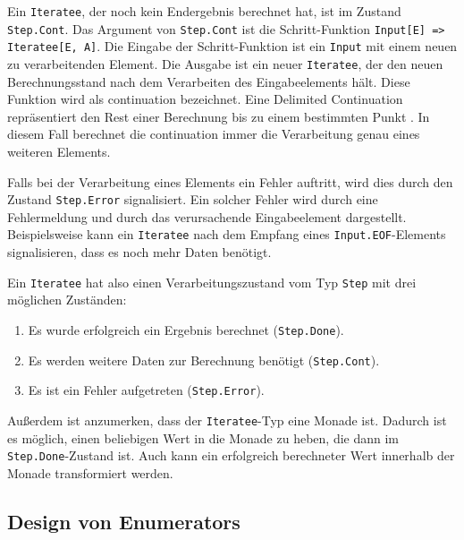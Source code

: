 Ein \lstinline|Iteratee|, der noch kein Endergebnis berechnet hat, ist im Zustand \lstinline|Step.Cont|.
Das Argument von \lstinline|Step.Cont| ist die Schritt-Funktion \lstinline[breaklines=true]|Input[E] => Iteratee[E, A]|.
Die Eingabe der Schritt-Funktion ist ein \lstinline|Input| mit einem neuen zu verarbeitenden Element.
Die Ausgabe ist ein neuer \lstinline|Iteratee|, der den neuen Berechnungsstand nach dem Verarbeiten des Eingabeelements hält.
Diese Funktion wird als \gls{continuation} bezeichnet.
Eine Delimited Continuation repräsentiert den Rest einer Berechnung bis zu einem bestimmten Punkt \cite[vgl.][S.~1]{continuations}.
In diesem Fall berechnet die \gls{continuation} immer die Verarbeitung genau eines weiteren Elements.

Falls bei der Verarbeitung eines Elements ein Fehler auftritt, wird dies durch den Zustand \lstinline|Step.Error| signalisiert.
Ein solcher Fehler wird durch eine Fehlermeldung und durch das verursachende Eingabeelement dargestellt.
Beispielsweise kann ein \lstinline|Iteratee| nach dem Empfang eines \lstinline|Input.EOF|-Elements signalisieren, dass es noch mehr Daten benötigt.

Ein \lstinline|Iteratee| hat also einen Verarbeitungszustand vom Typ \lstinline|Step| mit drei möglichen Zuständen:
\begin{enumerate}
  \item Es wurde erfolgreich ein Ergebnis berechnet (\lstinline|Step.Done|).
  \item Es werden weitere Daten zur Berechnung benötigt (\lstinline|Step.Cont|).
  \item Es ist ein Fehler aufgetreten (\lstinline|Step.Error|).
\end{enumerate}

Außerdem ist anzumerken, dass der \lstinline|Iteratee|-Typ eine Monade ist.
Dadurch ist es möglich, einen beliebigen Wert in die Monade zu heben, die dann im \lstinline|Step.Done|-Zustand ist.
Auch kann ein erfolgreich berechneter Wert innerhalb der Monade transformiert werden.



\subsection{Design von Enumerators} %
\label{sub:design_enumerators}


